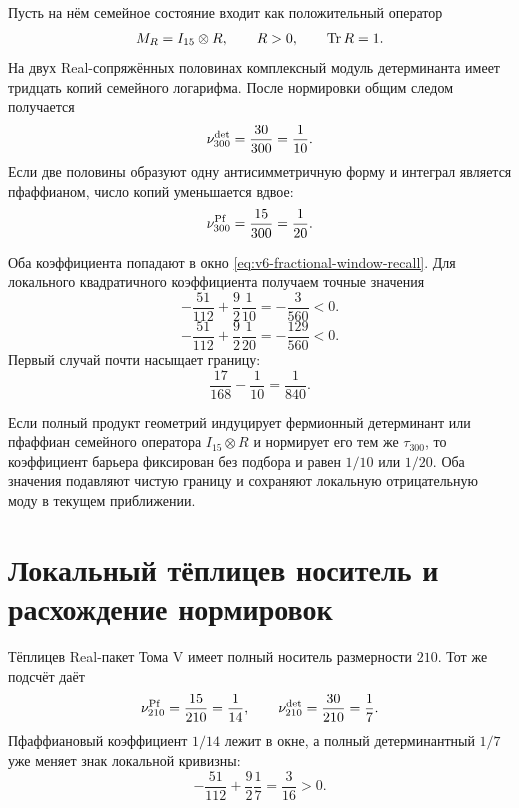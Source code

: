 Пусть на нём семейное состояние входит как положительный оператор
\begin{equation}
 M_R=I_{15}\otimes R,
 \qquad R>0,\qquad\operatorname{Tr} R=1.
\end{equation}
На двух Real-сопряжённых половинах комплексный модуль детерминанта имеет
тридцать копий семейного логарифма. После нормировки общим следом
получается
\begin{equation}
 \nu_{300}^{\rm det}=\frac{30}{300}=\frac1{10}.
 \label{eq:v6-m300-determinant-weight}
\end{equation}
Если две половины образуют одну антисимметричную форму и интеграл является
пфаффианом, число копий уменьшается вдвое:
\begin{equation}
 \nu_{300}^{\rm Pf}=\frac{15}{300}=\frac1{20}.
 \label{eq:v6-m300-pfaffian-weight}
\end{equation}

Оба коэффициента попадают в окно
\eqref{eq:v6-fractional-window-recall}. Для локального квадратичного
коэффициента получаем точные значения
\begin{equation}
 -\frac{51}{112}+\frac92\frac1{10}
 =-\frac3{560}<0.
 \label{eq:v6-m300-det-residual-curvature}
\end{equation}
\begin{equation}
 -\frac{51}{112}+\frac92\frac1{20}
 =-\frac{129}{560}<0.
 \label{eq:v6-m300-pf-residual-curvature}
\end{equation}
Первый случай почти насыщает границу:
\begin{equation}
 \frac{17}{168}-\frac1{10}=\frac1{840}.
\end{equation}

\begin{proposition}
Если полный продукт геометрий индуцирует фермионный детерминант или
пфаффиан семейного оператора $I_{15}\otimes R$ и нормирует его тем же
$\tau_{300}$, то коэффициент барьера фиксирован без подбора и равен
$1/10$ или $1/20$. Оба значения подавляют чистую границу и сохраняют
локальную отрицательную моду в текущем приближении.
\end{proposition}

\section{Локальный тёплицев носитель и расхождение нормировок}

Тёплицев Real-пакет Тома V имеет полный носитель размерности $210$.
Тот же подсчёт даёт
\begin{equation}
 \nu_{210}^{\rm Pf}=\frac{15}{210}=\frac1{14},
 \qquad
 \nu_{210}^{\rm det}=\frac{30}{210}=\frac17.
 \label{eq:v6-m210-fractional-weights}
\end{equation}
Пфаффиановый коэффициент $1/14$ лежит в окне, а полный детерминантный
$1/7$ уже меняет знак локальной кривизны:
\begin{equation}
 -\frac{51}{112}+\frac92\frac17=\frac3{16}>0.
\end{equation}

